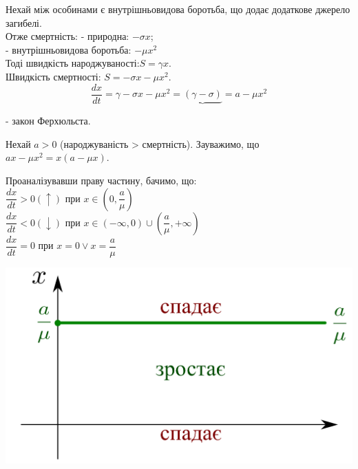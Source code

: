 Нехай між особинами є внутрішньовидова боротьба, що додає додаткове джерело загибелі.\\
Отже смертність: - природна:  $-\sigma x$;\\
\hspace*{4.01cm}- внутрішньовидова боротьба: $- \mu x^2$\\
Тоді швидкість народжуваності:$S = \gamma x$.\\
Швидкість смертності:  $ S = - \sigma x - \mu x^2$.\\
$$
\frac{dx}{dt}  = \gamma -  \sigma x - \mu x^2 = \underbrace{(\gamma - \sigma)}{=a} - \mu x^2
$$

\begin{center}
     - закон Ферхюльста.
\end{center}
Нехай $a > 0$ (народжуваність > смертність).  Зауважимо, що $ax - \mu x^2 = x ( a - \mu x)$.

Проаналізувавши праву частину, бачимо, що:\\
$
\dfrac{dx}{dt} > 0 (\uparrow) \text{ при } x \in (0, \dfrac{a}{\mu} )
$\\
$
\dfrac{dx}{dt} < 0 (\downarrow) \text{ при } x \in (- \infty, 0) \cup ( \dfrac{a}{\mu},  +\infty)
$\\
$
\dfrac{dx}{dt} = 0 \text{ при } x = 0 \lor x = \dfrac{a}{\mu}
$\\


\begin{center} \includegraphics[scale=0.3]{assets/lectures_recent-e4b7cd02.png} \end{center}


